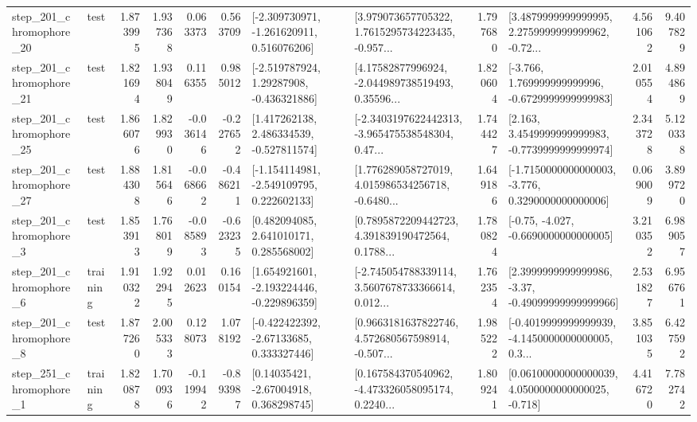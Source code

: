 \begin{tabular}{llrrrrllrlrr}
  step\_201\_chromophore\_20 &      test &      1.873995 &    1.937368 &      0.063373 &  0.563709 &   [-2.309730971, -1.261620911, 0.516076206] &  [3.979073657705322, 1.7615295734223435, -0.957... &       1.797680 &  [3.4879999999999995, 2.2759999999999962, -0.72... &            4.561062 &          9.407829 \\
  step\_201\_chromophore\_21 &      test &      1.821694 &    1.938049 &      0.116355 &  0.985012 &    [-2.519787924, 1.29287908, -0.436321886] &  [4.17582877996924, -2.044989738519493, 0.35596... &       1.820604 &   [-3.766, 1.769999999999996, -0.6729999999999983] &            2.010554 &          4.894869 \\
  step\_201\_chromophore\_25 &      test &      1.866076 &    1.829930 &     -0.036146 & -0.227652 &    [1.417262138, 2.486334539, -0.527811574] &  [-2.3403197622442313, -3.965475538548304, 0.47... &       1.744427 &   [2.163, 3.4549999999999983, -0.7739999999999974] &            2.343728 &          5.120338 \\
  step\_201\_chromophore\_27 &      test &      1.884308 &    1.815646 &     -0.068662 & -0.486211 &   [-1.154114981, -2.549109795, 0.222602133] &  [1.776289058727019, 4.015986534256718, -0.6480... &       1.649186 &  [-1.7150000000000003, -3.776, 0.3290000000000006] &            0.069009 &          3.899720 \\
   step\_201\_chromophore\_3 &      test &      1.853913 &    1.768019 &     -0.085893 & -0.623235 &     [0.482094085, 2.641010171, 0.285568002] &  [0.7895872209442723, 4.391839190472564, 0.1788... &       1.780824 &               [-0.75, -4.027, -0.6690000000000005] &            3.210352 &          6.989057 \\
   step\_201\_chromophore\_6 &  training &      1.910322 &    1.922945 &      0.012623 &  0.160154 &   [1.654921601, -2.193224446, -0.229896359] &  [-2.745054788339114, 3.5607678733366614, 0.012... &       1.762354 &  [2.3999999999999986, -3.37, -0.49099999999999966] &            2.531827 &          6.956761 \\
   step\_201\_chromophore\_8 &      test &      1.877260 &    2.005333 &      0.128073 &  1.078192 &    [-0.422422392, -2.67133685, 0.333327446] &  [0.9663181637822746, 4.572680567598914, -0.507... &       1.985222 &  [-0.4019999999999939, -4.1450000000000005, 0.3... &            3.851035 &          6.427592 \\
   step\_251\_chromophore\_1 &  training &      1.820878 &    1.700936 &     -0.119942 & -0.893987 &      [0.14035421, -2.67004918, 0.368298745] &  [0.167584370540962, -4.473326058095174, 0.2240... &       1.809241 &  [0.06100000000000039, 4.0500000000000025, -0.718] &            4.416720 &          7.782742 \\

\end{tabular}
